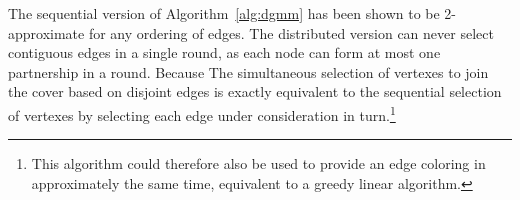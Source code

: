 The sequential version of Algorithm~\ref{alg:dgmm} has been shown to be 2-approximate for any ordering of edges. The distributed version can never select contiguous edges in a single round, as each node can form at most one partnership in a round. Because The simultaneous selection of vertexes to join the cover based on disjoint edges is exactly equivalent to the sequential selection of vertexes by selecting each edge under consideration in turn.\footnote{This algorithm could therefore also be used to provide an edge coloring in approximately the same time, equivalent to a greedy linear algorithm.}
